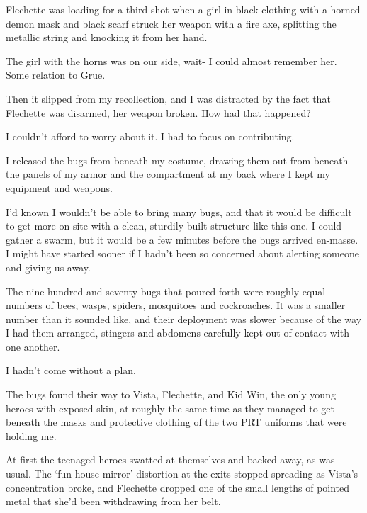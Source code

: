 Flechette was loading for a third shot when a girl in black clothing with a horned demon mask and black scarf struck her weapon with a fire axe, splitting the metallic string and knocking it from her hand.



The girl with the horns was on our side, wait- I could almost remember her.  Some relation to Grue.



Then it slipped from my recollection, and I was distracted by the fact that Flechette was disarmed, her weapon broken.  How had that happened?



I couldn't afford to worry about it.  I had to focus on contributing.



I released the bugs from beneath my costume, drawing them out from beneath the panels of my armor and the compartment at my back where I kept my equipment and weapons.



I'd known I wouldn't be able to bring many bugs, and that it would be difficult to get more on site with a clean, sturdily built structure like this one.  I could gather a swarm, but it would be a few minutes before the bugs arrived en-masse.  I might have started sooner if I hadn't been so concerned about alerting someone and giving us away.



The nine hundred and seventy bugs that poured forth were roughly equal numbers of bees, wasps, spiders, mosquitoes and cockroaches.  It was a smaller number than it sounded like, and their deployment was slower because of the way I had them arranged, stingers and abdomens carefully kept out of contact with one another.



I hadn't come without a plan.



The bugs found their way to Vista, Flechette, and Kid Win, the only young heroes with exposed skin, at roughly the same time as they managed to get beneath the masks and protective clothing of the two PRT uniforms that were holding me.



At first the teenaged heroes swatted at themselves and backed away, as was usual.  The `fun house mirror' distortion at the exits stopped spreading as Vista's concentration broke, and Flechette dropped one of the small lengths of pointed metal that she'd been withdrawing from her belt.



